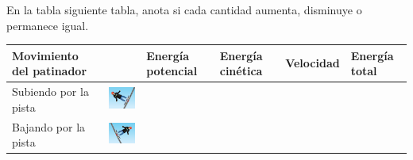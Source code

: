 \question[10] En la tabla siguiente tabla, anota si cada cantidad aumenta, disminuye o permanece igual.

\begin{table}[H]
    \centering
    \begin{tabular}{|l|l|l|l|l|l|}
        \hline
        Movimiento del patinador &                                               & Energía potencial & Energía cinética & Velocidad & Energía total \\
        \hline
        Subiendo por la pista    & \includegraphics[width=100pt]{../images/up}   &                   &                  &           &               \\
        \hline
        Bajando por la pista     & \includegraphics[width=100pt]{../images/down} &                   &                  &           &               \\
        \hline
    \end{tabular}
    \label{tab:upordown}
\end{table}